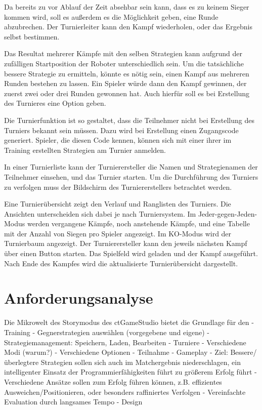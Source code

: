Da bereits zu vor Ablauf der Zeit absehbar sein kann, dass es zu keinem Sieger kommen wird, soll es
außerdem es die Möglichkeit geben, eine Runde abzubrechen. Der Turnierleiter kann den Kampf
wiederholen, oder das Ergebnis selbst bestimmen.

Das Resultat mehrerer Kämpfe mit den selben Strategien kann aufgrund der zufälligen Startposition
der Roboter unterschiedlich sein. Um die tatsächliche bessere Strategie zu ermitteln, könnte es
nötig sein, einen Kampf aus mehreren Runden bestehen zu lassen. Ein Spieler würde dann den Kampf
gewinnen, der zuerst zwei oder drei Runden gewonnen hat. Auch hierfür soll es bei Erstellung des
Turnieres eine Option geben.

Die Turnierfunktion ist so gestaltet, dass die Teilnehmer nicht bei Erstellung des Turniers bekannt
sein müssen. Dazu wird bei Erstellung einen Zugangscode generiert. Spieler, die diesen Code kennen,
können sich mit einer ihrer im Training erstellten Strategien am Turnier anmelden.

In einer Turnierliste kann der Turnierersteller die Namen und Strategienamen der Teilnehmer
einsehen, und das Turnier starten. Um die Durchführung des Turniers zu verfolgen muss der Bildschirm
des Turniererstellers betrachtet werden.

Eine Turnierübersicht zeigt den Verlauf und Ranglisten des Turniers. Die Ansichten unterscheiden
sich dabei je nach Turniersystem. Im Jeder-gegen-Jeden-Modus werden vergangene Kämpfe, noch
anstehende Kämpfe, und eine Tabelle mit der Anzahl von Siegen pro Spieler angezeigt. Im KO-Modus
wird der Turnierbaum angezeigt. Der Turnierersteller kann den jeweils nächsten Kampf über einen
Button starten. Das Spielfeld wird geladen und der Kampf ausgeführt. Nach Ende des Kampfes wird die
aktualisierte Turnierübersicht dargestellt.


\section{Anforderungsanalyse}

Die Mikrowelt des Storymodus des ctGameStudio bietet die Grundlage für den
- Training
  - Gegnerstrategien auswählen (vorgegebene und eigene)
  - Strategiemanagement: Speichern, Laden, Bearbeiten
- Turniere
  - Verschiedene Modi (warum?)
  - Verschiedene Optionen
  - Teilnahme
- Gameplay
  - Ziel: Bessere/überlegtere Strategien sollen sich auch im Matchergebnis niederschlagen, ein intelligenter Einsatz der Programmierfähigkeiten führt zu größerem Erfolg führt
  - Verschiedene Ansätze sollen zum Erfolg führen können, z.B. effizientes Ausweichen/Positionieren, oder besonders raffiniertes Verfolgen
  - Vereinfachte Evaluation durch langsames Tempo
- Design
